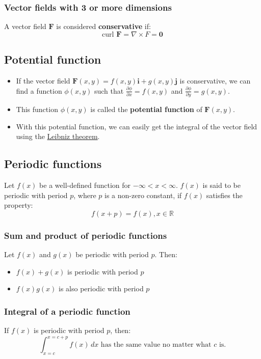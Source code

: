 \documentclass[11pt]{article}
\begin{document}
\subsubsection{Vector fields with 3 or more dimensions}
\label{sec:orgc4d1606}
A vector field \(\boldsymbol{F}\) is considered \textbf{conservative} if:
\[\text{curl } \boldsymbol{F} = \nabla \times F = \boldsymbol{0}\]

\subsection{Potential function}
\label{sec:orgffdbb0a}
\begin{itemize}
\item If the vector field \(\boldsymbol{F} (x, y) = f(x, y) \boldsymbol{i} + g(x, y) \boldsymbol{j}\) is conservative, we can find a function \(\phi (x, y)\) such that \(\frac{\partial \phi}{\partial x} = f(x, y)\) and \(\frac{\partial \phi}{\partial y} = g(x, y)\).
\item This function \(\phi (x, y)\) is called the \textbf{potential function} of \(\boldsymbol{F} (x, y)\).
\item With this potential function, we can easily get the integral of the vector field using the \hyperref[orgc41eb53]{Leibniz theorem}.
\end{itemize}

\subsection{Periodic functions}
\label{sec:orge15955f}
Let \(f(x)\) be a well-defined function for \(- \infty < x < \infty\). \(f(x)\) is said to be periodic with period \(p\), where \(p\) is a non-zero constant, if \(f(x)\) satisfies the property:
\[f(x + p) = f(x), x \in \mathbb{R}\]

\subsubsection{Sum and product of periodic functions}
\label{sec:orgc6d4087}
Let \(f(x)\) and \(g(x)\) be periodic with period \(p\). Then:
\begin{itemize}
\item \(f(x) + g(x)\) is periodic with period \(p\)
\item \(f(x) g(x)\) is also periodic with period \(p\)
\end{itemize}

\subsubsection{Integral of a periodic function}
\label{sec:org03714b2}
If \(f(x)\) is periodic with period \(p\), then:
\[\int_{x = c}^{x = c + p} f(x) \, dx \text{ has the same value no matter what } c \text{ is.}\]
\end{document}
